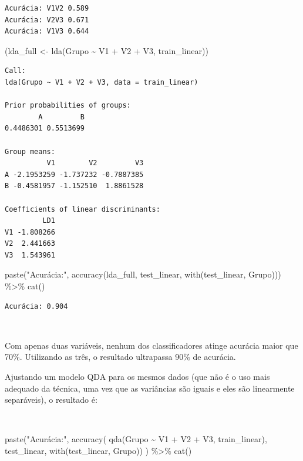 \documentclass[
  a4paperpaper,
]{article}
\newenvironment{Shaded}{\begin{snugshade}}{\end{snugshade}}
\newcommand{\FunctionTok}[1]{\textcolor[rgb]{0.28,0.35,0.67}{#1}}
\newcommand{\NormalTok}[1]{\textcolor[rgb]{0.00,0.23,0.31}{#1}}
\newcommand{\OtherTok}[1]{\textcolor[rgb]{0.00,0.23,0.31}{#1}}
\newcommand{\SpecialCharTok}[1]{\textcolor[rgb]{0.37,0.37,0.37}{#1}}
\newcommand{\StringTok}[1]{\textcolor[rgb]{0.13,0.47,0.30}{#1}}
\begin{document}
\begin{verbatim}
Acurácia: V1V2 0.589 
Acurácia: V2V3 0.671 
Acurácia: V1V3 0.644 
\end{verbatim}

\begin{Shaded}
\begin{Highlighting}[]
\NormalTok{(lda\_full }\OtherTok{\textless{}{-}} \FunctionTok{lda}\NormalTok{(Grupo }\SpecialCharTok{\textasciitilde{}}\NormalTok{ V1 }\SpecialCharTok{+}\NormalTok{ V2 }\SpecialCharTok{+}\NormalTok{ V3, train\_linear))}
\end{Highlighting}
\end{Shaded}

\begin{verbatim}
Call:
lda(Grupo ~ V1 + V2 + V3, data = train_linear)

Prior probabilities of groups:
        A         B 
0.4486301 0.5513699 

Group means:
          V1        V2         V3
A -2.1953259 -1.737232 -0.7887385
B -0.4581957 -1.152510  1.8861528

Coefficients of linear discriminants:
         LD1
V1 -1.808266
V2  2.441663
V3  1.543961
\end{verbatim}

\begin{Shaded}
\begin{Highlighting}[]
\FunctionTok{paste}\NormalTok{(}\StringTok{"Acurácia:"}\NormalTok{, }\FunctionTok{accuracy}\NormalTok{(lda\_full, test\_linear, }\FunctionTok{with}\NormalTok{(test\_linear, Grupo))) }\SpecialCharTok{\%\textgreater{}\%}
  \FunctionTok{cat}\NormalTok{()}
\end{Highlighting}
\end{Shaded}

\begin{verbatim}
Acurácia: 0.904
\end{verbatim}

~

Com apenas duas variáveis, nenhum dos classificadores atinge acurácia
maior que 70\%. Utilizando as três, o resultado ultrapassa 90\% de
acurácia.

Ajustando um modelo QDA para os mesmos dados (que não é o uso mais
adequado da técnica, uma vez que as variâncias são iguais e eles são
linearmente separáveis), o resultado é:

~

\begin{Shaded}
\begin{Highlighting}[]
\FunctionTok{paste}\NormalTok{(}\StringTok{"Acurácia:"}\NormalTok{, }\FunctionTok{accuracy}\NormalTok{(}
  \FunctionTok{qda}\NormalTok{(Grupo }\SpecialCharTok{\textasciitilde{}}\NormalTok{ V1 }\SpecialCharTok{+}\NormalTok{ V2 }\SpecialCharTok{+}\NormalTok{ V3, train\_linear),}
\NormalTok{  test\_linear, }\FunctionTok{with}\NormalTok{(test\_linear, Grupo))}
\NormalTok{) }\SpecialCharTok{\%\textgreater{}\%}
  \FunctionTok{cat}\NormalTok{()}
\end{Highlighting}
\end{Shaded}
\end{document}
